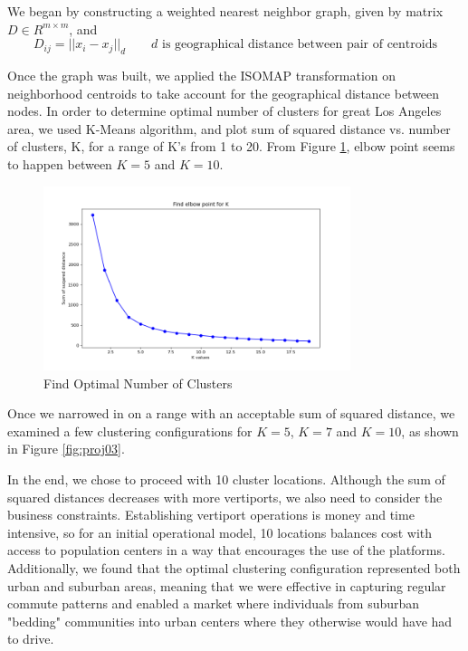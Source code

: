 \documentclass{article}
\begin{document}
We began by constructing a weighted nearest neighbor graph, given by matrix $D\in R^{m\times m}$, and
\[
D_{ij} = ||x_i - x_j||_d \qquad d \text{ is geographical distance between pair of centroids}
\]

Once the graph was built, we applied the ISOMAP transformation on neighborhood centroids to take account for the geographical distance between nodes. In order to determine optimal number of clusters for great Los Angeles area, we used K-Means algorithm, and plot sum of squared distance vs. number of clusters, K, for a range of K's from 1 to 20. From Figure \ref{fig:proj02}, elbow point seems to happen between $K=5$ and $K=10$.

\begin{figure}[ht]
\centering
\includegraphics[width=0.8\textwidth]{proj02.png}
\vspace*{-10mm}
\caption{Find Optimal Number of Clusters}
\label{fig:proj02}
\end{figure}

Once we narrowed in on a range with an acceptable sum of squared distance, we examined a few clustering configurations for $K=5$, $K=7$ and $K=10$, as shown in Figure \ref{fig:proj03}. 

In the end, we chose to proceed with 10 cluster locations. Although the sum of squared distances decreases with more vertiports, we also need to consider the business constraints. Establishing vertiport operations is money and time intensive, so for an initial operational model, 10 locations balances cost with access to population centers in a way that encourages the use of the platforms. Additionally, we found that the optimal clustering configuration represented both urban and suburban areas, meaning that we were effective in capturing regular commute patterns and enabled a market where individuals from suburban "bedding" communities into urban centers where they otherwise would have had to drive. 
\end{document}
